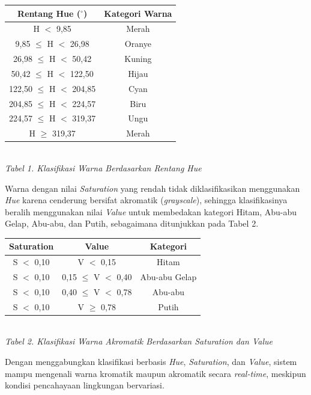 \begin{table}[H]
  \centering
  {\footnotesize
  \begin{tabular}{|c|c|}
    \hline
    \textbf{Rentang Hue ($^\circ$)} & \textbf{Kategori Warna} \\
    \hline
    H $<$ 9,85 & Merah \\ \hline
    9,85 $\leq$ H $<$ 26,98 & Oranye \\ \hline
    26,98 $\leq$ H $<$ 50,42 & Kuning \\ \hline
    50,42 $\leq$ H $<$ 122,50 & Hijau \\ \hline
    122,50 $\leq$ H $<$ 204,85 & Cyan \\ \hline
    204,85 $\leq$ H $<$ 224,57 & Biru \\ \hline
    224,57 $\leq$ H $<$ 319,37 & Ungu \\ \hline
    H $\geq$ 319,37 & Merah \\ \hline
  \end{tabular}}\\[0.3em]
  {\footnotesize\textit{Tabel 1. Klasifikasi Warna Berdasarkan Rentang Hue}}
\end{table}

Warna dengan nilai \textit{Saturation} yang rendah tidak diklasifikasikan menggunakan \textit{Hue} karena cenderung bersifat akromatik (\textit{grayscale}), sehingga klasifikasinya beralih menggunakan nilai \textit{Value} untuk membedakan kategori Hitam, Abu-abu Gelap, Abu-abu, dan Putih, sebagaimana ditunjukkan pada Tabel 2.

\begin{table}[H]
  \centering
  {\footnotesize
  \begin{tabular}{|c|c|c|}
    \hline
    \textbf{Saturation} & \textbf{Value} & \textbf{Kategori} \\
    \hline
    S $<$ 0,10 & V $<$ 0,15 & Hitam \\ \hline
    S $<$ 0,10 & 0,15 $\leq$ V $<$ 0,40 & Abu-abu Gelap \\ \hline
    S $<$ 0,10 & 0,40 $\leq$ V $<$ 0,78 & Abu-abu \\ \hline
    S $<$ 0,10 & V $\geq$ 0,78 & Putih \\ \hline
  \end{tabular}}\\[0.3em]
  {\footnotesize\textit{Tabel 2. Klasifikasi Warna Akromatik Berdasarkan Saturation dan Value}}
\end{table}

Dengan menggabungkan klasifikasi berbasis \textit{Hue}, \textit{Saturation}, dan \textit{Value}, sistem mampu mengenali warna kromatik maupun akromatik secara \textit{real-time}, meskipun kondisi pencahayaan lingkungan bervariasi.

